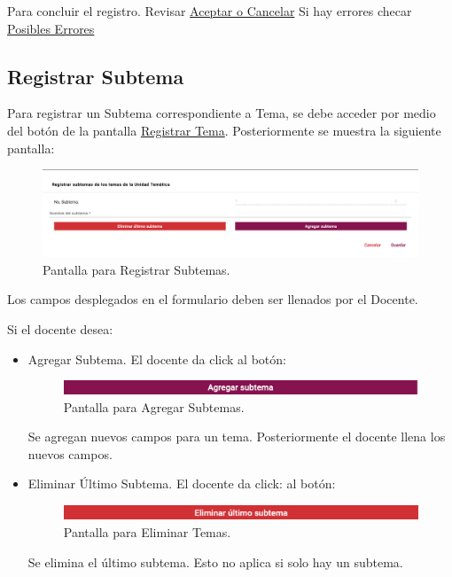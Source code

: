 Para concluir el registro. Revisar \hyperlink{AceptarCancelar}{Aceptar o Cancelar}
Si hay errores checar \hyperlink{Errores}{Posibles Errores}

\pagebreak
\hypertarget{RegistrarSubtema}{\subsection{Registrar Subtema}}



Para registrar un Subtema correspondiente a Tema, se debe acceder por medio del botón  de la pantalla \hyperlink{RTema}{Registrar Tema}. Posteriormente se muestra la siguiente pantalla:

\begin{figure}[!hbtp]
    \centering
    \includegraphics[width=0.7\linewidth]{images/SP6/RegistrarSubtema.png}
    \caption{Pantalla para Registrar Subtemas.} 
\end{figure}

Los campos desplegados en el formulario deben ser llenados por el Docente.

Si el docente desea:
\begin{itemize}
    \item Agregar Subtema. El docente da click al botón:
    \begin{figure}[!hbtp]
    \centering
    \includegraphics[width=0.4\linewidth]{images/SP6/AgregarSubtema.png}
    \caption{Pantalla para Agregar Subtemas.} 
    \end{figure}
    Se agregan nuevos campos para un tema. Posteriormente el docente llena los nuevos campos.
    \item Eliminar Último Subtema. El docente da click: al botón:
    \begin{figure}[!hbtp]
    \centering
    \includegraphics[width=0.4\linewidth]{images/SP6/EliminarSubtema.png}
    \caption{Pantalla para Eliminar Temas.} 
    \end{figure}
    Se elimina el último subtema. Esto no aplica si solo hay un subtema.
\end{itemize}

